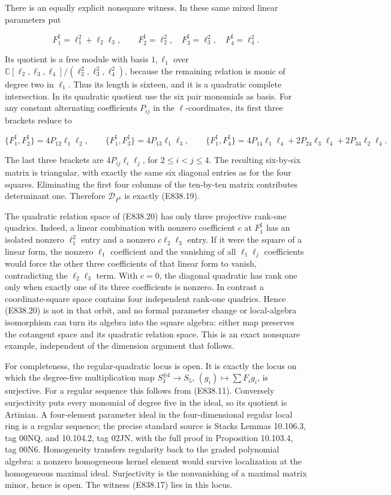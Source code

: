 There is an equally explicit nonsquare witness. In these same mixed
linear parameters put

\[
 F^\sharp_1=\ell_1^2+\ell_2\ell_3,\qquad
 F^\sharp_2=\ell_2^2,\quad F^\sharp_3=\ell_3^2,\quad
 F^\sharp_4=\ell_4^2.
 \tag{E838.20}
\]

Its quotient is a free module with basis \(1,\ell_1\) over
\(\mathbb C[\ell_2,\ell_3,\ell_4]/(\ell_2^2,\ell_3^2,\ell_4^2)\),
because the remaining relation is monic of degree two in \(\ell_1\).
Thus its length is sixteen, and it is a quadratic complete intersection.
In its quadratic quotient use the six pair monomials as basis. For any
constant alternating coefficients \(P_{ij}\) in the
\(\ell\)-coordinates, its first three brackets reduce to

\[
 \{F^\sharp_1,F^\sharp_2\}=4P_{12}\ell_1\ell_2,\qquad
 \{F^\sharp_1,F^\sharp_3\}=4P_{13}\ell_1\ell_3,\qquad
 \{F^\sharp_1,F^\sharp_4\}
   =4P_{14}\ell_1\ell_4
      +2P_{24}\ell_3\ell_4+2P_{34}\ell_2\ell_4.
 \tag{E838.21}
\]

The last three brackets are \(4P_{ij}\ell_i\ell_j\), for
\(2\le i<j\le4\). The resulting six-by-six matrix is triangular, with
exactly the same six diagonal entries as for the four squares.
Eliminating the first four columns of the ten-by-ten matrix contributes
determinant one. Therefore \(\mathcal D_{F^\sharp}\) is exactly
(E838.19).

The quadratic relation space of (E838.20) has only three projective
rank-one quadrics. Indeed, a linear combination with nonzero coefficient
\(c\) at \(F^\sharp_1\) has an isolated nonzero \(\ell_1^2\) entry and a
nonzero \(c\ell_2\ell_3\) entry. If it were the square of a linear form,
the nonzero \(\ell_1\) coefficient and the vanishing of all
\(\ell_1\ell_j\) coefficients would force the other three coefficients
of that linear form to vanish, contradicting the \(\ell_2\ell_3\) term.
With \(c=0\), the diagonal quadratic has rank one only when exactly one
of its three coefficients is nonzero. In contrast a coordinate-square
space contains four independent rank-one quadrics. Hence (E838.20) is
not in that orbit, and no formal parameter change or local-algebra
isomorphism can turn its algebra into the square algebra: either map
preserves the cotangent space and its quadratic relation space. This is
an exact nonsquare example, independent of the dimension argument that
follows.

For completeness, the regular-quadratic locus is open. It is exactly the
locus on which the degree-five multiplication map
\(S_3^{\oplus4}\to S_5\), \((g_i)\mapsto\sum F_i g_i\), is surjective.
For a regular sequence this follows from (E838.11). Conversely
surjectivity puts every monomial of degree five in the ideal, so its
quotient is Artinian. A four-element parameter ideal in the
four-dimensional regular local ring is a regular sequence; the precise
standard source is Stacks Lemmas 10.106.3, tag 00NQ, and 10.104.2, tag
02JN, with the full proof in Proposition 10.103.4, tag 00N6. Homogeneity
transfers regularity back to the graded polynomial algebra: a nonzero
homogeneous kernel element would survive localization at the homogeneous
maximal ideal. Surjectivity is the nonvanishing of a maximal matrix
minor, hence is open. The witness (E838.17) lies in this locus.

